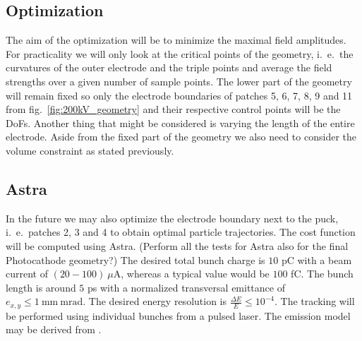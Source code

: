 \subsection{Optimization}
The aim of the optimization will be to minimize the maximal field amplitudes. For practicality we will only look at the critical points of the geometry, i.~e.~the curvatures of the outer electrode and the triple points and average the field strengths over a given number of sample points. The lower part of the geometry will remain fixed so only the electrode boundaries of patches 5, 6, 7, 8, 9 and 11 from fig.~\ref{fig:200kV_geometry} and their respective control points will be the DoFs. Another thing that might be considered is varying the length of the entire electrode. Aside from the fixed part of the geometry we also need to consider the volume constraint as stated previously.

\subsection{Astra}
In the future we may also optimize the electrode boundary next to the puck, i.~e.~patches 2, 3 and 4 to obtain optimal particle trajectories. The cost function will be computed using Astra. (Perform all the tests for Astra also for the final Photocathode geometry?)
The desired total bunch charge is $10$ pC with a beam current of $(20-100)\ \mu\mathrm{A}$, whereas a typical value would be $100$ fC. The bunch length is around $5$ ps with a normalized transversal emittance of $e_{x,y} \leq 1\ \mathrm{mm\ mrad}$. The desired energy resolution is $\frac{\Delta E}{E} \leq 10^{-4}$.
The tracking will be performed using individual bunches from a pulsed laser. The emission model may be derived from \cite{wagner}.
